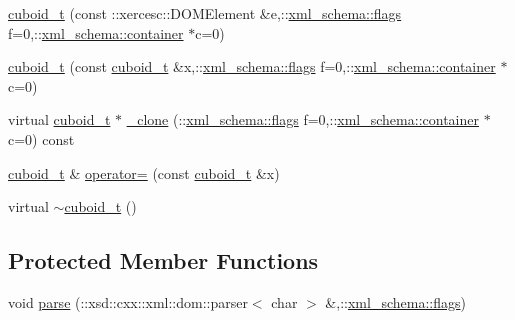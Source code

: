 \begin{DoxyCompactItemize}
\item 
\hyperlink{classcuboid__t_afa1b7588ca19d8c5d00fb8c5dcf92bc8}{cuboid\+\_\+t} (const \+::xercesc\+::\+D\+O\+M\+Element \&e,\+::\hyperlink{namespacexml__schema_a0612287d030cb2732d31a45b258fdc87}{xml\+\_\+schema\+::flags} f=0,\+::\hyperlink{namespacexml__schema_ada9aa30dc722e93ee2ed7243085402a5}{xml\+\_\+schema\+::container} $\ast$c=0)
\item 
\hyperlink{classcuboid__t_a1574d539277176b5fff09a374c142c90}{cuboid\+\_\+t} (const \hyperlink{classcuboid__t}{cuboid\+\_\+t} \&x,\+::\hyperlink{namespacexml__schema_a0612287d030cb2732d31a45b258fdc87}{xml\+\_\+schema\+::flags} f=0,\+::\hyperlink{namespacexml__schema_ada9aa30dc722e93ee2ed7243085402a5}{xml\+\_\+schema\+::container} $\ast$c=0)
\item 
virtual \hyperlink{classcuboid__t}{cuboid\+\_\+t} $\ast$ \hyperlink{classcuboid__t_aa31bc17c300c78f7c15b08d60bbdefbf}{\+\_\+clone} (\+::\hyperlink{namespacexml__schema_a0612287d030cb2732d31a45b258fdc87}{xml\+\_\+schema\+::flags} f=0,\+::\hyperlink{namespacexml__schema_ada9aa30dc722e93ee2ed7243085402a5}{xml\+\_\+schema\+::container} $\ast$c=0) const 
\item 
\hyperlink{classcuboid__t}{cuboid\+\_\+t} \& \hyperlink{classcuboid__t_a63f90f88f500fa731186f53d2c668552}{operator=} (const \hyperlink{classcuboid__t}{cuboid\+\_\+t} \&x)
\item 
virtual \hyperlink{classcuboid__t_ad45791533f3643e2e2f565801c0ca20a}{$\sim$cuboid\+\_\+t} ()
\end{DoxyCompactItemize}
\subsection*{Protected Member Functions}
\begin{DoxyCompactItemize}
\item 
void \hyperlink{classcuboid__t_ab79e4219bf9a205aff7cbbda1207d138}{parse} (\+::xsd\+::cxx\+::xml\+::dom\+::parser$<$ char $>$ \&,\+::\hyperlink{namespacexml__schema_a0612287d030cb2732d31a45b258fdc87}{xml\+\_\+schema\+::flags})
\end{DoxyCompactItemize}
